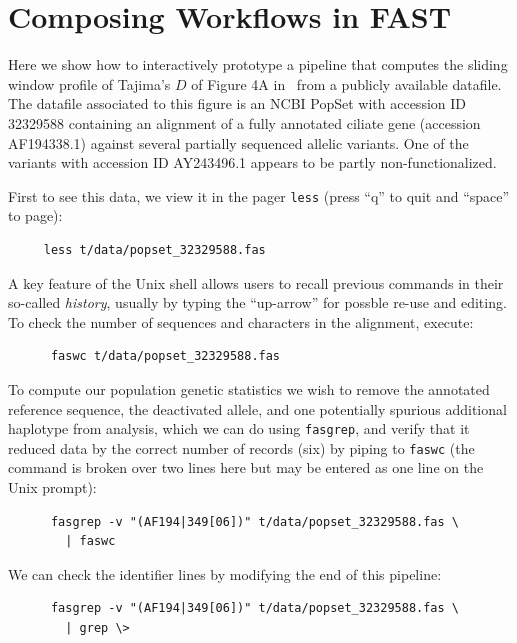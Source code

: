 \documentclass{frontiersSCNS} %
\begin{document}
\section{Composing Workflows in FAST}

Here we show how to interactively prototype a pipeline that computes
the sliding window profile of Tajima's $D$ of Figure 4A
in~\citep{Ardell03} from a publicly available datafile. The datafile
associated to this figure is an NCBI PopSet with accession ID 32329588
containing an alignment of a fully annotated ciliate gene (accession
AF194338.1) against several partially sequenced allelic variants. One
of the variants with accession ID AY243496.1 appears to be partly
non-functionalized.

First to see this data, we view it in the pager {\tt less} (press
``q'' to quit and ``space'' to page):

\begin{verbatim}
     less t/data/popset_32329588.fas
\end{verbatim}

\noindent A key feature of the Unix shell allows users to recall previous
commands in their so-called {\it history}, usually by typing the
``up-arrow'' for possble re-use and editing. To check the number of
sequences and characters in the alignment, execute:

\begin{verbatim}
      faswc t/data/popset_32329588.fas
\end{verbatim}

\noindent To compute our population genetic statistics we wish to
remove the annotated reference sequence, the deactivated allele, and
one potentially spurious additional haplotype from analysis, which we
can do using {\tt fasgrep}, and verify that it reduced data by the
correct number of records (six) by piping to {\tt faswc} (the command
is broken over two lines here but may be entered as one line on the
Unix prompt):

\begin{verbatim}
      fasgrep -v "(AF194|349[06])" t/data/popset_32329588.fas \
        | faswc
\end{verbatim}

\noindent We can check the identifier lines by modifying the end of
this pipeline:

\begin{verbatim}
      fasgrep -v "(AF194|349[06])" t/data/popset_32329588.fas \ 
        | grep \>
\end{verbatim}
\end{document}
